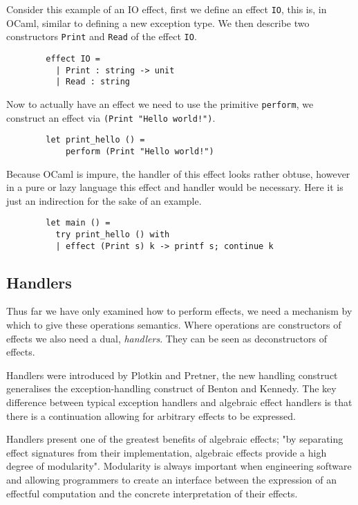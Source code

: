 \begin{example}
    Consider this example of an IO effect,
    first we define an effect \texttt{IO},
    this is, in OCaml, similar to defining
    a new exception type.
    We then describe two constructors
    \texttt{Print} and \texttt{Read}
    of the effect \texttt{IO}.
    \begin{verbatim}
        effect IO =
          | Print : string -> unit
          | Read : string\end{verbatim}
    Now to actually have an effect we need to use the primitive \texttt{perform},
    we construct an effect via \texttt{(Print "Hello world!")}.
    \begin{verbatim}
        let print_hello () =
            perform (Print "Hello world!")\end{verbatim}
    Because OCaml is impure, the handler of this effect looks rather obtuse,
    however in a pure or lazy language this effect and handler would be necessary.
    Here it is just an indirection for the sake of an example.
    \begin{verbatim}
        let main () =
          try print_hello () with
          | effect (Print s) k -> printf s; continue k\end{verbatim}
\end{example}

\subsection{Handlers}
Thus far we have only examined how to perform effects,
we need a mechanism by which to give these operations semantics.
Where operations are constructors of effects we also need a dual, \textit{handlers}.
They can be seen as deconstructors of effects\cite{Plotkin:2002dw}.

Handlers were introduced by Plotkin and Pretner\cite{Plotkin:2009dr},
the new handling construct generalises the exception-handling
construct of Benton and Kennedy\cite{benton2001exceptional}.
The key difference between typical exception handlers
and algebraic effect handlers is that
there is a continuation allowing for arbitrary effects to be expressed.

Handlers present one of the greatest benefits of algebraic effects;
"by separating effect signatures from their implementation,
algebraic effects provide a high degree of modularity"\cite{kammar2013handlers}.
Modularity is always important when engineering software
and allowing programmers to create an interface between
the expression of an effectful computation
and the concrete interpretation of their effects.


